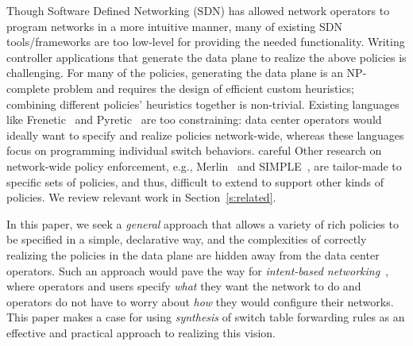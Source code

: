Though Software Defined Networking (SDN) has allowed network operators
to program networks in a more intuitive manner, many of existing SDN
tools/frameworks are too low-level for providing the needed
functionality. Writing controller applications that generate the
data plane to realize the above policies is challenging. %
For many of the
  policies, generating the data plane is an NP-complete problem and
  requires the design of efficient custom heuristics; combining
  different policies' heuristics together is non-trivial. Existing
languages like Frenetic~\cite{frenetic} and Pyretic~\cite{pyretic} are
too constraining: data center operators would ideally want to specify
and realize policies network-wide, whereas these languages focus on
programming individual switch behaviors. %
careful
Other research on network-wide policy enforcement, e.g.,
Merlin~\cite{Merlin} and SIMPLE~\cite{simple}, are tailor-made to
specific sets of policies, and thus, difficult to extend to support
other kinds of policies. We review relevant work in
Section~\ref{s:related}.


In this paper, we seek a {\em general} approach that allows a variety
of rich policies to be specified in a simple, declarative way, and the
complexities of correctly realizing the policies in the data plane are
hidden away from the data center operators. Such an approach would
pave the way for {\em intent-based networking}~\cite{}, where
operators and users specify {\em what} they want the network to do and
operators do not have to worry about {\em how} they would configure
their networks. %
This paper makes a case for using \emph{synthesis} of switch table
forwarding rules as an effective and practical approach to realizing
this vision.

